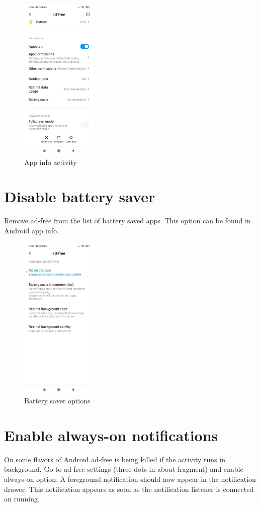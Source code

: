 \documentclass[11pt]{article}
\begin{document}
\begin{figure}[htbp]
\centering
\includegraphics[height=300px]{./res/app-info-autostart.jpg}
\caption{App info activity}
\end{figure}


\section{Disable battery saver}
\label{sec:orge261dfc}
Remove ad-free from the list of battery saved apps. This option can be
found in Android app info.

\begin{figure}[htbp]
\centering
\includegraphics[height=300px]{./res/app-info-battery-saver.jpg}
\caption{Battery saver options}
\end{figure}

\section{Enable always-on notifications}
\label{sec:org300b8a9}
On some flavors of Android ad-free is being killed if the activity
runs in background. Go to ad-free settings (three dots in about
fragment) and enable always-on option. A foreground notification
should now appear in the notification drawer. This notification
appears as soon as the notification listener is connected an running.
\end{document}
